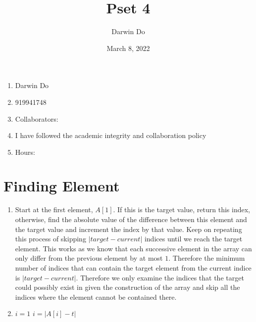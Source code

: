 \documentclass{article}
\title{Pset 4}
\begin{document}
\newcommand{\Not}{\textbf{not}}

\date{March 8, 2022 }
\author{Darwin Do}

\maketitle

\begin{enumerate}
    \item Darwin Do
    \item 919941748
    \item Collaborators: 
    \item I have followed the academic integrity and collaboration policy
    \item Hours: 
\end{enumerate}

\newpage

\section{Finding Element}

\begin{enumerate}
    \item Start at the first element, \(A[1]\). If this is the target value, return this index, otherwise, find the absolute value of the difference between this element and the target value and increment the index by that value.
        Keep on repeating this process of skipping \(|target - current|\) indices until we reach the target element.
        This works as we know that each successive element in the array can only differ from the previous element by at most \(1\). Therefore the minimum number of indices that can contain the target element from
        the current indice is \(|target - current|\). Therefore we only examine the indices that the target could possibly exist in given the construction of the array and skip all the indices where the element cannot be contained there.

    \item 
        \begin{algorithmic}
                \State $i = 1$
                    \State $i = |A[i] - t|$
                \EndWhile
            \EndFunction
        \end{algorithmic}
\end{enumerate}
\end{document}
